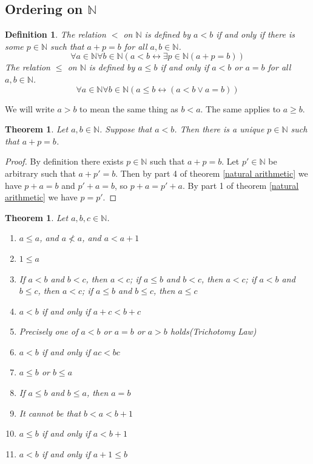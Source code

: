 \documentclass{report}
\newtheorem{theorem}[theo]{Theorem}
\newtheorem{definition}[theo]{Definition}
\begin{document}
\subsection{Ordering on $\mathbb N$}
\begin{definition}
The relation $<$ on $\mathbb N$ is defined by $a<b$ if and only if there is some $p\in\mathbb N$ such that $a+p=b$ for all $a,b\in\mathbb N$.
\begin{equation*}
\forall a\in\mathbb N\forall b\in\mathbb N(a<b\leftrightarrow\exists p\in\mathbb N(a+p=b))
\end{equation*}
The relation $\leq$ on $\mathbb N$ is defined by $a\leq b$ if and only if $a<b$ or $a=b$ for all $a,b\in\mathbb N$.
\begin{equation*}
\forall a\in\mathbb N\forall b\in\mathbb N(a\leq b\leftrightarrow(a<b\lor a=b))
\end{equation*}
\end{definition}
\noindent We will write $a>b$ to mean the same thing as $b<a$. The same applies to $a\geq b$.
\begin{theorem}
Let $a,b\in\mathbb N$. Suppose that $a<b$. Then there is a unique $p\in\mathbb N$ such that $a+p=b$.
\end{theorem}
\begin{proof}
By definition there exists $p\in\mathbb N$ such that $a+p=b$. Let $p'\in\mathbb N$ be arbitrary such that $a+p'=b$. Then by part 4 of theorem \ref{natural arithmetic}
we have $p+a=b$ and $p'+a=b$, so $p+a=p'+a$. By part 1 of theorem \ref{natural arithmetic} we have $p=p'$.
\end{proof}
\begin{theorem}\label{natural ordering}
Let $a,b,c\in\mathbb N$.
\begin{enumerate}
\item $a\leq a$, and $a\nless a$, and $a<a+1$
\item $1\leq a$
\item If $a<b$ and $b<c$, then $a<c$; if $a\leq b$ and $b<c$, then $a<c$; if $a<b$ and $b\leq c$, then $a<c$; if $a\leq b$ and $b\leq c$, then $a\leq c$
\item $a<b$ if and only if $a+c<b+c$
\item Precisely one of $a<b$ or $a=b$ or $a>b$ holds\quad(Trichotomy Law)
\item $a<b$ if and only if $ac<bc$
\item $a\leq b$ or $b\leq a$
\item If $a\leq b$ and $b\leq a$, then $a=b$
\item It cannot be that $b<a<b+1$
\item $a\leq b$ if and only if $a<b+1$
\item $a<b$ if and only if $a+1\leq b$
\end{enumerate}
\end{theorem}
\end{document}
